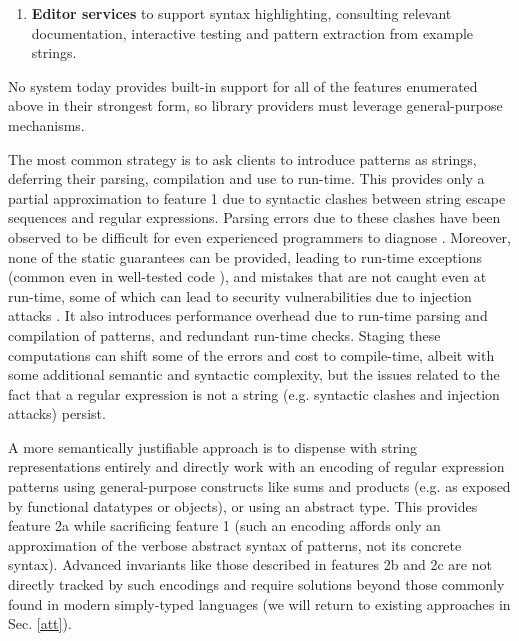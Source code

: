 \begin{enumerate}
\item \textbf{Editor services} to support syntax highlighting, consulting relevant documentation, interactive testing and pattern extraction from example strings.
\end{enumerate}

No system today provides built-in support for all of the features enumerated above in their strongest form, so library providers must leverage  general-purpose mechanisms. %

The most common strategy is to ask clients to introduce patterns as strings, deferring their  parsing, compilation and use to run-time. This provides only a partial approximation to feature 1 due to syntactic clashes between string escape sequences and regular expressions. Parsing errors due to these clashes have been observed to be difficult for even experienced programmers to diagnose \cite{Omar:2012:ACC:2337223.2337324}. Moreover, none of the static guarantees can be provided, leading to run-time exceptions (common even in well-tested code \cite{spishak2012type}), and mistakes that are not caught even at run-time, some of which can lead to security vulnerabilities due to injection attacks \cite{owasp2013}. It also introduces performance overhead due to run-time parsing and compilation of patterns, and redundant run-time checks.  Staging these computations can shift some of the errors and cost to compile-time, albeit with some additional semantic and syntactic complexity, but the issues related to the fact that a regular expression is not a string (e.g. syntactic clashes and injection attacks) persist.%

A more semantically justifiable approach is to dispense with string representations entirely and directly work with an encoding of regular expression patterns using  general-purpose constructs like sums and  products (e.g. as exposed by functional datatypes or objects), or using an abstract type. This provides feature 2a while sacrificing feature 1 (such an encoding affords only an approximation of the verbose abstract syntax of patterns, not its concrete syntax). Advanced invariants like those described in features 2b and 2c are not directly tracked by such encodings and require solutions beyond those commonly found in modern simply-typed languages (we will return to existing approaches  in Sec. \ref{att}).%


